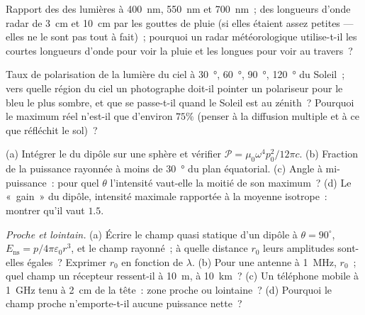 \begin{exercise}[$\star$]\label{exo:b2:dipole-radiation:3}
Rapport des  des lumières à \qty{400}{nm}, \qty{550}{nm} et
\qty{700}{nm}~; des longueurs d'onde radar de \qty{3}{cm} et \qty{10}{cm} par les
gouttes de pluie (si elles étaient assez petites --- elles ne le sont pas tout à fait)~; pourquoi un
radar météorologique utilise-t-il les courtes longueurs d'onde pour voir la pluie et les longues pour
voir au travers~?
\end{exercise}

\begin{exercise}[$\star$]\label{exo:b2:dipole-radiation:4}
Taux de polarisation de la lumière du ciel à \qty{30}{\degree}, \qty{60}{\degree},
\qty{90}{\degree}, \qty{120}{\degree} du Soleil~; vers quelle région du ciel un
photographe doit-il pointer un polariseur pour le bleu le plus sombre, et que
se passe-t-il quand le Soleil est au zénith~? Pourquoi le maximum réel n'est-il que d'environ
$75\%$ (penser à la diffusion multiple et à ce que réfléchit le sol)~?
\end{exercise}

\begin{exercise}[$\star\star$]\label{exo:b2:dipole-radiation:5}
(a) Intégrer le  du dipôle sur une sphère et
vérifier $\mathcal P = \mu_0\omega^4p_0^2/12\pi c$. (b) Fraction de la puissance
rayonnée à moins de \qty{30}{\degree} du plan équatorial. (c) Angle à
mi-puissance~: pour quel $\theta$ l'intensité vaut-elle la moitié de son maximum~? (d) Le
«~gain~» du dipôle, intensité maximale rapportée à la moyenne isotrope~:
montrer qu'il vaut $1.5$.
\end{exercise}

\begin{exercise}[$\star\star$]\label{exo:b2:dipole-radiation:6}
\emph{Proche et lointain.} (a) Écrire le champ quasi statique d'un dipôle à
$\theta = 90^\circ$, $E_{\text{ns}} = p/4\pi\varepsilon_0r^3$, et le champ rayonné~; à
quelle distance $r_0$ leurs amplitudes sont-elles égales~? Exprimer $r_0$ en fonction de
$\lambda$. (b) Pour une antenne à \qty{1}{MHz}, $r_0$~; quel champ un récepteur
ressent-il à \qty{10}{m}, à \qty{10}{km}~? (c) Un téléphone mobile à \qty{1}{GHz} tenu
à \qty{2}{cm} de la tête~: zone proche ou lointaine~? (d) Pourquoi le champ proche
n'emporte-t-il aucune puissance nette~?
\end{exercise}


